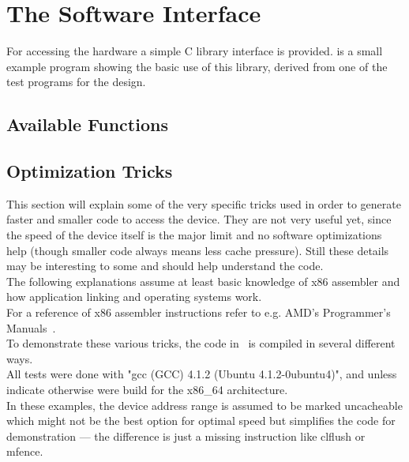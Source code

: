 \newcommand*{\fancyreflstlabelprefix}{lst}
\frefformat{vario}{\fancyreflstlabelprefix}{listing\fancyrefdefaultspacing#1#3}
\Frefformat{vario}{\fancyreflstlabelprefix}{Listing\fancyrefdefaultspacing#1#3}

\lstset{basicstyle=\ttfamily}
\lstset{breaklines=true}
\lstset{captionpos=b,columns=[c]flexible}
\lstset{language=C}

\chapter{The Software Interface}
For accessing the hardware a simple C library interface is provided.
 is a small example program showing the basic
use of this library, derived from one of the test programs for the design.

\section{Available Functions}
\section{Optimization Tricks}
This section will explain some of the very specific tricks used in
order to generate faster and smaller code to access the device.
They are not very useful yet, since the speed of the device itself
is the major limit and no software optimizations help (though smaller
code always means less cache pressure).
Still these details may be interesting to some and should help
understand the code.\\
The following explanations assume at least basic knowledge of x86
assembler and how application linking and operating systems work.\\
For a reference of x86 assembler instructions refer to e.g. AMD's
Programmer's Manuals~\cite{amdinstr}.\\
To demonstrate these various tricks, the code in~
is compiled in several different ways.\\
All tests were done with "gcc (GCC) 4.1.2 (Ubuntu 4.1.2-0ubuntu4)",
and unless indicate otherwise were build for the x86\_64 architecture.\\
In these examples, the device address range is assumed to be marked
uncacheable which might not be the best option for optimal speed but
simplifies the code for demonstration --- the difference is just a
missing instruction like clflush or mfence.\\


